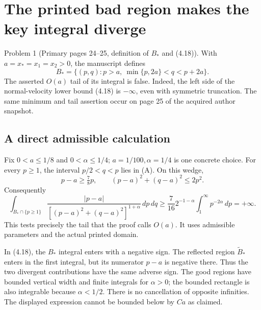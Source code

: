 \documentclass[10pt]{article}
\begin{document}
\section*{The printed bad region makes the key integral diverge}
Problem 1 (Primary pages 24–25, definition of \(B_*\) and (4.18)).  With \(a=x_*=x_1=x_2>0\), the manuscript defines \[B_*=\{(p,q):p>a,\ \min\{p,2a\}<q<p+2a\}.
 \tag{A}\] The asserted \(O(a)\) tail of its integral is false. Indeed, the left side of the normal-velocity lower bound (4.18) is \(-\infty\), even with symmetric truncation. The same minimum and tail assertion occur on page 25 of the acquired author snapshot.\par
\subsection*{A direct admissible calculation}
Fix \(0<a\le1/8\) and \(0<\alpha\le1/4\); \(a=1/100,\alpha=1/4\) is one concrete choice. For every \(p\ge1\), the interval \(p/2<q<p\) lies in (A). On this wedge, \[p-a\ge\tfrac78p,\qquad
 (p-a)^2+(q-a)^2\le2p^2.\] Consequently \[\int_{B_*\cap\{p\ge1\}}
       \frac{|p-a|}{[(p-a)^2+(q-a)^2]^{1+\alpha}}\,dp\,dq
 \ge \frac7{16}2^{-1-\alpha}
             \int_1^\infty p^{-2\alpha}\,dp
 =+\infty.
 \tag{B}\] This tests precisely the tail that the proof calls \(O(a)\). It uses admissible parameters and the actual printed domain.\par
In (4.18), the \(B_*\) integral enters with a negative sign. The reflected region \(\widetilde B_*\) enters in the first integral, but its numerator \(p-a\) is negative there. Thus the two divergent contributions have the same adverse sign. The good regions have bounded vertical width and finite integrals for \(\alpha>0\); the bounded rectangle is also integrable because \(\alpha<1/2\). There is no cancellation of opposite infinities. The displayed expression cannot be bounded below by \(Ca\) as claimed.\par
\end{document}
